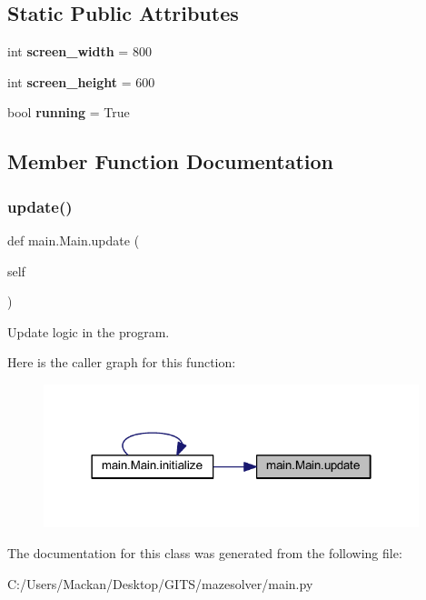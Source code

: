 \subsection*{Static Public Attributes}
\begin{DoxyCompactItemize}
\item 
\mbox{\label{classmain_1_1_main_ac9a4e89a42e8582bab693ed68eb641cf}} 
int {\bfseries screen\+\_\+width} = 800
\item 
\mbox{\label{classmain_1_1_main_adaced1cdeabcec51adad44379dad6e00}} 
int {\bfseries screen\+\_\+height} = 600
\item 
\mbox{\label{classmain_1_1_main_a69805780cbb1b6a6ff7e1da277357d4c}} 
bool {\bfseries running} = True
\end{DoxyCompactItemize}


\subsection{Member Function Documentation}
\mbox{\label{classmain_1_1_main_a545b7274163905d774eb82734ed41a81}} 
\subsubsection{\texorpdfstring{update()}{update()}}
{\footnotesize\ttfamily def main.\+Main.\+update (\begin{DoxyParamCaption}\item[{}]{self }\end{DoxyParamCaption})}



Update logic in the program. 

Here is the caller graph for this function\+:
\nopagebreak
\begin{figure}[H]
\begin{center}
\leavevmode
\includegraphics[width=310pt]{classmain_1_1_main_a545b7274163905d774eb82734ed41a81_icgraph}
\end{center}
\end{figure}


The documentation for this class was generated from the following file\+:\begin{DoxyCompactItemize}
\item 
C\+:/\+Users/\+Mackan/\+Desktop/\+G\+I\+T\+S/mazesolver/main.\+py\end{DoxyCompactItemize}

